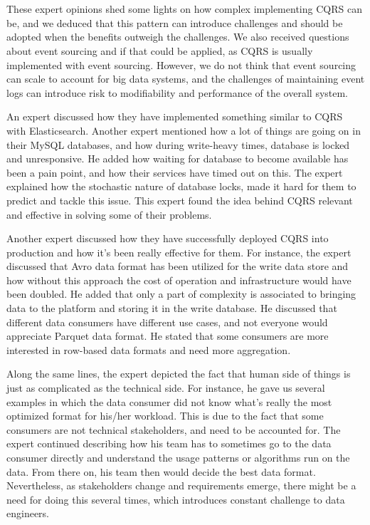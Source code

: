 \documentclass{bmcart}
\begin{document}
\,

\setlength{\fboxsep}{0.7em}
\noindent{}

\,

These expert opinions shed some lights on how complex implementing CQRS can be, and we deduced that this pattern can introduce challenges and should be adopted when the benefits outweigh the challenges. We also received questions about event sourcing and if that could be applied, as CQRS is usually implemented with event sourcing. However, we do not think that event sourcing can scale to account for big data systems, and the challenges of maintaining event logs can introduce risk to modifiability and performance of the overall system. 


An expert discussed how they have implemented something similar to CQRS with Elasticsearch. Another expert mentioned how a lot of things are going on in their MySQL databases, and how during write-heavy times, database is locked and unresponsive. He added how waiting for database to become available has been a pain point, and how their services have timed out on this. The expert explained how the stochastic nature of database locks, made it hard for them to predict and tackle this issue. This expert found the idea behind CQRS relevant and effective in solving some of their problems. 

Another expert discussed how they have successfully deployed CQRS into production and how it's been really effective for them. For instance, the expert discussed that Avro data format has been utilized for the write data store and how without this approach the cost of operation and infrastructure would have been doubled. He added that only a part of complexity is associated to bringing data to the platform and storing it in the write database. He discussed that different data consumers have different use cases, and not everyone would appreciate Parquet data format. He stated that some consumers are more interested in row-based data formats and need more aggregation. 

Along the same lines, the expert depicted the fact that human side of things is just as complicated as the technical side. For instance, he gave us several examples in which the data consumer did not know what's really the most optimized format for his/her workload. This is due to the fact that some consumers are not technical stakeholders, and need to be accounted for. The expert continued describing how his team has to sometimes go to the data consumer directly and understand the usage patterns or algorithms run on the data. From there on, his team then would decide the best data format. Nevertheless, as stakeholders change and requirements emerge, there might be a need for doing this several times, which introduces constant challenge to data engineers.
\end{document}
